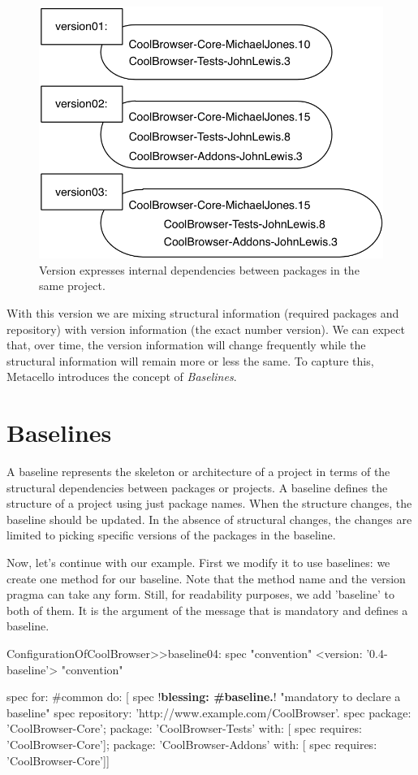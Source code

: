 \documentclass[a4paper,10pt,twoside]{book}
\begin{document}
\begin{figure}
\begin{center}
\includegraphics[width=0.6\linewidth]{version03}
\caption{Version  expresses internal dependencies between packages in the same project.\label{fig:version03}}
\end{center}
\end{figure}


With this version we are mixing structural information (required packages and repository) with version information (the exact number version).
We can expect that, over time, the version information will change frequently while the structural information will remain more or less the same.
To capture this, Metacello introduces the concept of \emph{Baselines}.


\section{Baselines}
A baseline represents the skeleton or architecture of a project in terms of the structural dependencies between packages or projects. A baseline defines the structure of a project using just package names. When the structure changes, the baseline should be updated. In the absence of structural changes, the changes are limited to picking specific versions of the packages in the baseline.

Now, let's continue with our example. First we modify it to use baselines: we create one method for our baseline. Note that the method name and the version pragma can take any form. Still, for readability purposes, we add 'baseline' to both of them.
It is the argument of the  message that is mandatory and defines a baseline.
\needspace{17ex}
\begin{code}{}
ConfigurationOfCoolBrowser>>baseline04: spec 				"convention"
       <version: '0.4-baseline'> 					              		"convention"

       spec for: #common do: [
              spec !\textbf{blessing: \#baseline.}!    "mandatory to declare a baseline"
              spec repository: 'http://www.example.com/CoolBrowser'.
              spec
                  package: 'CoolBrowser-Core';
                  package: 'CoolBrowser-Tests' with: [ spec requires: 'CoolBrowser-Core'];
                  package: 'CoolBrowser-Addons' with: [ spec requires: 'CoolBrowser-Core']]
\end{code}
\end{document}
